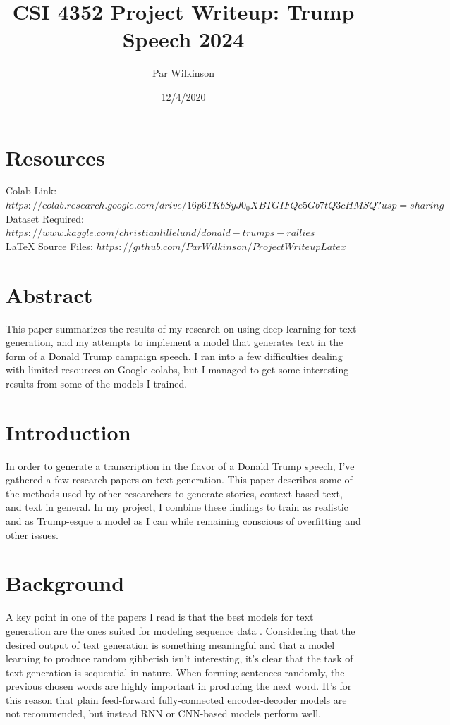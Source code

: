\documentclass[a4paper]{article}
\title{CSI 4352 Project Writeup: Trump Speech 2024}
\author{Par Wilkinson}
\date{12/4/2020}
\begin{document}
\lstset{language=Python}

\maketitle

\section{Resources}
Colab Link: $https://colab.research.google.com/drive/16p6TKbSyJ0_0XBTGIFQe5Gb7tQ3cHMSQ?usp=sharing$ \\
Dataset Required:  $https://www.kaggle.com/christianlillelund/donald-trumps-rallies$ \\
LaTeX Source Files: $https://github.com/ParWilkinson/ProjectWriteupLatex$ 

\section{Abstract}

This paper summarizes the results of my research on using deep learning for text generation, and my attempts to implement a model that generates text in the form of a Donald Trump campaign speech. I ran into a few difficulties dealing with limited resources on Google colabs, but I managed to get some interesting results from some of the models I trained. 

\section{Introduction}

In order to generate a transcription in the flavor of a Donald Trump speech, I've gathered a few research papers on text generation. This paper describes some of the methods used by other researchers to generate stories, context-based text, and text in general. In my project, I combine these findings to train as realistic and as Trump-esque a model as I can while remaining conscious of overfitting and other issues.

\section{Background}

A key point in one of the papers I read is that the best models for text generation are the ones suited for modeling sequence data \cite{Z}. Considering that the desired output of text generation is something meaningful and that a model learning to produce random gibberish isn't interesting, it's clear that the task of text generation is sequential in nature. When forming sentences randomly, the previous chosen words are highly important in producing the next word. It's for this reason that plain feed-forward fully-connected encoder-decoder models are not recommended, but instead RNN or CNN-based models perform well. \\
\end{document}
